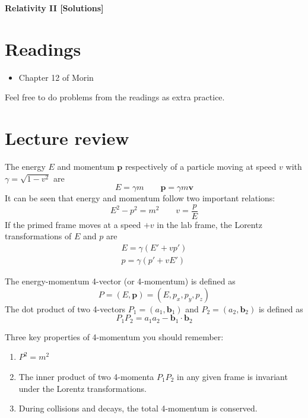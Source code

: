 \documentclass[11pt]{scrartcl}
\title{\titlee}
\author{Cambridge Physics Academy}
\date{2023-2024}
\newcommand{\titlee}{Relativity II [Solutions]}
\begin{document}
\thispagestyle{empty}
\begin{center}
    
    
    \Huge \textbf{\textsf{\titlee}}

    \large \theauthor
\end{center}

\setcounter{section}{-1}
\section{Readings}
\begin{itemize}
    \item Chapter 12 of Morin
\end{itemize}
Feel free to do problems from the readings as extra practice.


\section{Lecture review}
\begin{defn}
The energy $E$ and momentum $\mathbf p$ respectively of a particle moving at speed $v$ with $\gamma=\sqrt{1-v^2}$ are $$E=\gamma m\qquad \mathbf p=\gamma m\mathbf v$$It can be seen that energy and momentum follow two important relations: $$E^2-p^2=m^2\qquad v=\frac{p}{E}$$If the primed frame moves at a speed $+v$ in the lab frame, the Lorentz transformations of $E$ and $p$ are \begin{gather*}
    E=\gamma (E'+vp')\\
    p=\gamma(p'+vE')
\end{gather*}
\end{defn}
\begin{defn}[4-momentum]
The energy-momentum 4-vector (or 4-momentum) is defined as $$P=(E,\mathbf p)=(E,p_x,p_y,p_z)$$
The dot product of two 4-vectors $P_1=(a_1,\mathbf b_1)$ and $P_2=(a_2,\mathbf b_2)$ is defined as $$P_1P_2=a_1a_2-\mathbf b_1\cdot \mathbf b_2$$
\end{defn}
\begin{theorem}
Three key properties of 4-momentum you should remember: \begin{enumerate}
    \item $P^2=m^2$
    \item The inner product of two 4-momenta $P_1P_2$ in any given frame is invariant under the Lorentz transformations.
    \item During collisions and decays, the total 4-momentum is conserved.
\end{enumerate}
\end{theorem}
\end{document}
